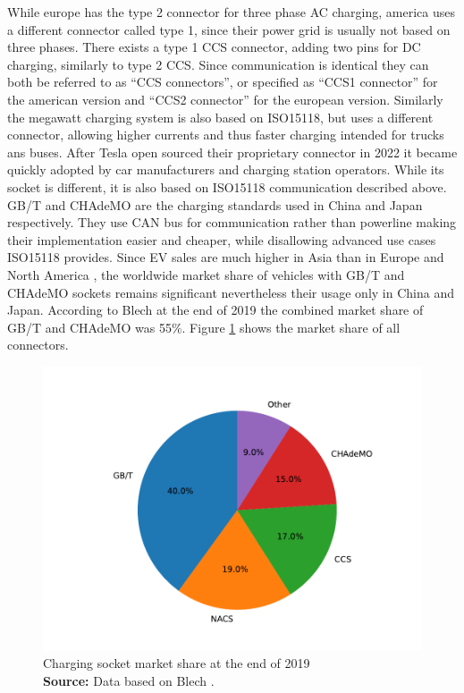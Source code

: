 \documentclass[conference,flushend]{iaria} %
\newcommand*{\captionsource}[2]{%
  \caption[{#1}]{%
    #1%
    \\\hspace{\linewidth}%
    \textbf{Source:} #2%
  }%
}
\begin{document}
While europe has the type 2 connector for three phase AC charging, america uses a different connector called type 1, since their power grid is usually not based on three phases.
There exists a type 1 CCS connector, adding two pins for DC charging, similarly to type 2 CCS.
Since communication is identical they can both be referred to as \enquote{CCS connectors}, or specified as \enquote{CCS1 connector} for the american version and \enquote{CCS2 connector} for the european version.
Similarly the megawatt charging system is also based on ISO15118, but uses a different connector, allowing higher currents and thus faster charging intended for trucks ans buses.
After Tesla open sourced their proprietary connector in 2022 \cite{noauthor_opening_nodate} it became quickly adopted by car manufacturers and charging station operators.
While its socket is different, it is also based on ISO15118 communication described above. \\
GB/T and CHAdeMO are the charging standards used in China and Japan respectively.
They use CAN bus for communication rather than powerline making their implementation easier and cheaper, while disallowing advanced use cases ISO15118 provides.
Since EV sales are much higher in Asia than in Europe and North America \cite{noauthor_trends_nodate}, the worldwide market share of vehicles with GB/T and CHAdeMO sockets remains significant nevertheless their usage only in China and Japan.
According to Blech \cite{blech_project_nodate} at the end of 2019 the combined market share of GB/T and CHAdeMO was 55\%. Figure \ref{fig:connector_marketshare} shows the market share of all connectors.

\begin{figure}[ht]
    \centering
    \includegraphics[width=.489\textwidth]{graphs/worldwide_plugs.pdf}
    \captionsource{Charging socket market share at the end of 2019}{Data based on Blech \cite{blech_project_nodate}.}
    \label{fig:connector_marketshare}
\end{figure}

\end{document}
